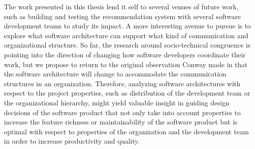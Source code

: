 The work presented in this thesis lend it self to several venues of future work, such as building and testing the recommendation system with several software development teams to study its impact.
A more interesting avenue to pursue is to explore what software architecture can support what kind of communication and organizational structure.
So far, the research around socio-technical congruence is pointing into the direction of changing how software developers coordinate their work, but we propose to return to the original observation Conway made in that the software architecture will change to accommodate the communication structures in an organization.
Therefore, analyzing software architectures with respect to the project properties, such as distribution of the development team or the organizational hierarchy, might yield valuable insight in guiding design decisions of the software product that not only take into account properties to increase the feature richness or maintainability of the software product but is optimal with respect to properties of the organization and the development team in order to increase productivity and quality. 
